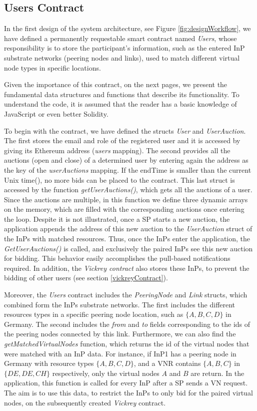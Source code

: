 \subsection{Users Contract}

In the first design of the system architecture, see Figure \ref{fig:designWorkflow}, we have defined a permanently requestable smart contract named \textit{Users}, whose responsibility is to store the participant's information, such as the entered InP substrate networks (peering nodes and links), used to match different virtual node types in specific locations. 

Given the importance of this contract, on the next pages, we present the fundamental data structures and functions that describe its functionality. To understand the code, it is assumed that the reader has a basic knowledge of JavaScript or even better Solidity.

To begin with the contract, we have defined the structs \textit{User} and \textit{UserAuction}. The first stores the email and role of the registered user and it is accessed by giving its Ethereum address (\textit{users} mapping). The second provides all the auctions (open and close) of a determined user by entering again the address as the key of the \textit{userAuctions} mapping. If the endTime is smaller than the current Unix time(), no more bids can be placed to the contract. This last struct is accessed by the function \textit{getUserAuctions()}, which gets all the auctions of a user. Since the auctions are multiple, in this function we define three dynamic arrays on the memory, which are filled with the corresponding auctions once entering the loop. Despite it is not illustrated, once a SP starts a new auction, the application appends the address of this new auction to the \textit{UserAuction} struct of the InPs with matched resources. Thus, once the InPs enter the application, the \textit{GetUserAuctions()} is called, and exclusively the paired InPs see this new auction for bidding. This behavior easily accomplishes the pull-based notifications required. In addition, the \textit{Vickrey contract} also stores these InPs, to prevent the bidding of other users (see section \ref{vickreyContract}).

Moreover, the \textit{Users} contract includes the \textit{PeeringNode} and \textit{Link} structs, which combined form the InPs substrate networks. The first includes the different resources types in a specific peering node location, such as $\{A, B, C, D\}$ in Germany. The second includes the \textit{from} and \textit{to} fields corresponding to the ids of the peering nodes connected by this link. Furthermore, we can also find the \textit{getMatchedVirtualNodes} function, which returns the id of the virtual nodes that were matched with an InP data. For instance, if InP1 has a peering node in Germany with resource types $\{A,B,C,D\}$, and a VNR contains $\{A, B, C\}$ in $\{DE, DE, CH\}$ respectively, only the virtual nodes $A$ and $B$ are return. In the application, this function is called for every InP after a SP sends a VN request. The aim is to use this data, to restrict the InPs to only bid for the paired virtual nodes, on the subsequently created \textit{Vickrey} contract. 

